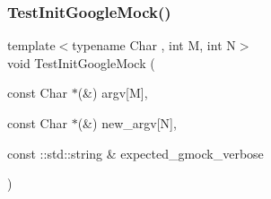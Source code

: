\mbox{\label{_obj__test_2lib_2googletest-master_2googlemock_2test_2gmock__test_8cc_ac9c8ae8722c330d47f75dee43fb8ab78}} 
\subsubsection{\texorpdfstring{TestInitGoogleMock()}{TestInitGoogleMock()}}
{\footnotesize\ttfamily template$<$typename Char , int M, int N$>$ \\
void Test\+Init\+Google\+Mock (\begin{DoxyParamCaption}\item[{const Char $\ast$(\&)}]{argv\mbox{[}\+M\mbox{]},  }\item[{const Char $\ast$(\&)}]{new\+\_\+argv\mbox{[}\+N\mbox{]},  }\item[{const \+::std\+::string \&}]{expected\+\_\+gmock\+\_\+verbose }\end{DoxyParamCaption})}

